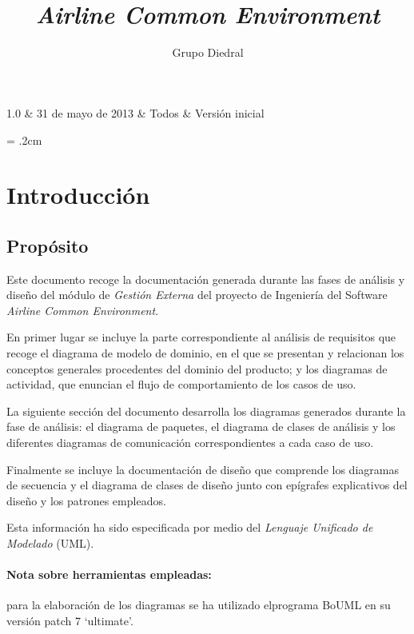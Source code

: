 \documentclass[11pt, a4paper, twoside, titlepage]{article}
\title{\doctitle\\\textsl{Airline Common Environment}}
\author{Grupo Diedral}
\newcommand*{\doctitle}{Análisis y diseño}
\newcommand*{\docversion}{1.0}
\begin{document}
	\begin{tablacambios}
		1.0 & 31 de mayo de 2013 & Todos & Versión inicial
	\end{tablacambios}


	\portadaace{\doctitle}{\docversion}

	\tableofcontents
	\newpage

	\iniciarnumeraciondiedral

	\parskip = .2cm

	\section{Introducción}
		\subsection{Propósito}
			Este documento recoge la documentación generada durante las fases de análisis y diseño del módulo de \textit{Gestión Externa} del proyecto de Ingeniería del Software \textit{Airline Common Environment}.

			En primer lugar se incluye la parte correspondiente al análisis de requisitos que recoge el diagrama de modelo de dominio, en el que se presentan y relacionan los conceptos generales procedentes del dominio del producto; y los diagramas de actividad, que enuncian el flujo de comportamiento de los casos de uso.

			La siguiente sección del documento desarrolla los diagramas generados durante la fase de análisis: el diagrama de paquetes, el diagrama de clases de análisis y los diferentes diagramas de comunicación correspondientes a cada caso de uso.

			Finalmente se incluye la documentación de diseño que comprende los diagramas de secuencia y el diagrama de clases de diseño junto con epígrafes explicativos del diseño y los patrones empleados.


		Esta información ha sido especificada por medio del {\itshape Lenguaje Unificado de Modelado} (UML).

		\paragraph*{Nota sobre herramientas empleadas:} para la elaboración de los diagramas se ha utilizado el\break programa {\normalfont BoUML} en su versión { patch 7 `ultimate'}.
\end{document}
